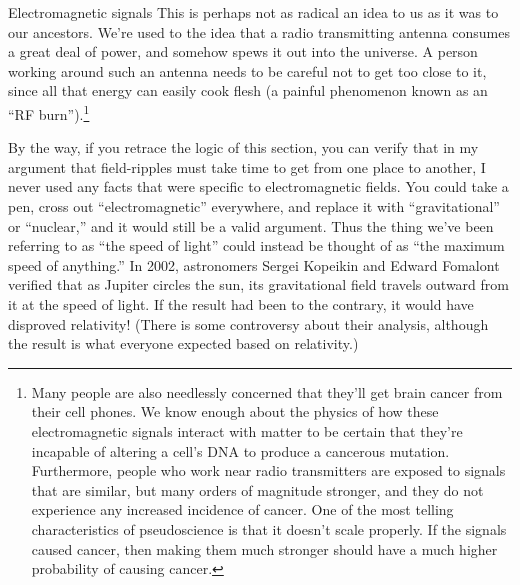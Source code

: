 \begin{envsubsection}{Electromagnetic signals}
This is perhaps not as radical an idea to us as it was to
our ancestors. We're used to the idea that a radio
transmitting antenna consumes a great deal of power, and
somehow spews it out into the universe. A person working
around such an antenna needs to be careful not to get too
close to it, since all that energy can easily cook flesh (a
painful phenomenon known as an ``RF burn'').\footnote{Many people
are also needlessly concerned that they'll get brain cancer from their
cell phones. We know enough about the physics of how these electromagnetic signals
interact with matter to be certain that they're incapable of altering a cell's
DNA to produce a cancerous mutation. Furthermore, people who work near radio
transmitters are exposed to signals that are similar, but many orders of magnitude
stronger, and they do not experience any increased incidence of cancer. One of
the most telling characteristics of pseudoscience is that it doesn't scale
properly. If the signals caused cancer, then making them much stronger should
have a much higher probability of causing cancer.}

By the way, if you retrace the logic of this section, you can verify that
in my argument that field-ripples must take time to get from one place to
another, I never used any facts that were specific to electromagnetic fields.
You could take a pen, cross out ``electromagnetic'' everywhere, and replace it
with ``gravitational'' or ``nuclear,'' and it would still be a valid argument.
Thus the thing we've been referring to as ``the speed of light'' could instead
be thought of as ``the maximum speed of anything.'' In 2002, astronomers
Sergei Kopeikin and Edward Fomalont verified that as Jupiter circles the sun,
its gravitational field travels outward from it at the speed of light. 
If the result had been to the contrary, it would have disproved relativity!
(There is some controversy about their analysis, although the result is
what everyone expected based on relativity.)


\end{envsubsection}	
%
